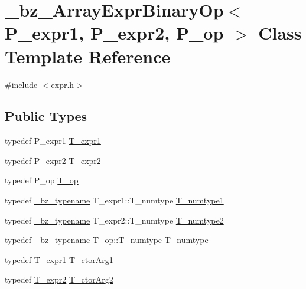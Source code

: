 \hypertarget{class__bz__ArrayExprBinaryOp}{}\section{\+\_\+bz\+\_\+\+Array\+Expr\+Binary\+Op$<$ P\+\_\+expr1, P\+\_\+expr2, P\+\_\+op $>$ Class Template Reference}
\label{class__bz__ArrayExprBinaryOp}


{\ttfamily \#include $<$expr.\+h$>$}

\subsection*{Public Types}
\begin{DoxyCompactItemize}
\item 
typedef P\+\_\+expr1 \hyperlink{class__bz__ArrayExprBinaryOp_af88171beef51e2874b4508cab88b3990}{T\+\_\+expr1}
\item 
typedef P\+\_\+expr2 \hyperlink{class__bz__ArrayExprBinaryOp_a9fbe318600732f09ecc4faebffd47a51}{T\+\_\+expr2}
\item 
typedef P\+\_\+op \hyperlink{class__bz__ArrayExprBinaryOp_a66e4dec28822c9524aadba055c096054}{T\+\_\+op}
\item 
typedef \hyperlink{compiler_8h_a1bc40add3e72effc9cf69dbe445cbdfd}{\+\_\+bz\+\_\+typename} T\+\_\+expr1\+::\+T\+\_\+numtype \hyperlink{class__bz__ArrayExprBinaryOp_a476876cf5d5b81e475d3d11cc3c2cf37}{T\+\_\+numtype1}
\item 
typedef \hyperlink{compiler_8h_a1bc40add3e72effc9cf69dbe445cbdfd}{\+\_\+bz\+\_\+typename} T\+\_\+expr2\+::\+T\+\_\+numtype \hyperlink{class__bz__ArrayExprBinaryOp_a0215bafa1cef89a153255579d332d7a1}{T\+\_\+numtype2}
\item 
typedef \hyperlink{compiler_8h_a1bc40add3e72effc9cf69dbe445cbdfd}{\+\_\+bz\+\_\+typename} T\+\_\+op\+::\+T\+\_\+numtype \hyperlink{class__bz__ArrayExprBinaryOp_a7e6a612fc4afccbeaa3a2fdd32f8850e}{T\+\_\+numtype}
\item 
typedef \hyperlink{class__bz__ArrayExprBinaryOp_af88171beef51e2874b4508cab88b3990}{T\+\_\+expr1} \hyperlink{class__bz__ArrayExprBinaryOp_aa340af608a55f42c26e972397ed90323}{T\+\_\+ctor\+Arg1}
\item 
typedef \hyperlink{class__bz__ArrayExprBinaryOp_a9fbe318600732f09ecc4faebffd47a51}{T\+\_\+expr2} \hyperlink{class__bz__ArrayExprBinaryOp_a1cfa5814a1b2f6c01a1a989f43e0c13c}{T\+\_\+ctor\+Arg2}
\end{DoxyCompactItemize}
